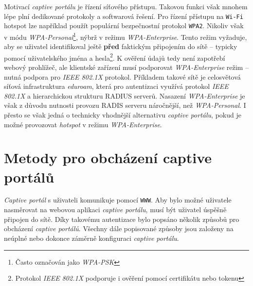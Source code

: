 \documentclass[thesis=M,czech]{FITthesis}[2012/10/20]
\begin{document}
Motivací \textit{captive portálu} je řízení síťového přístupu. Takovou funkci však mnohem lépe\cite{bakalarka-srovnani-captive-fwall-nac} plní dedikované protokoly a softwarová řešení. Pro řízení přístupu na \texttt{Wi-Fi} hotspot lze například použít populární bezpečnostní protokol \texttt{WPA2}. Nikoliv však v módu \textit{WPA-Personal}\footnote{Často označován jako \textit{WPA-PSK}}, nýbrž v režimu \textit{WPA-Enterprise}. Tento režim vyžaduje, aby se uživatel identifikoval ještě \textbf{před} faktickým připojením do sítě -- typicky pomocí uživatelského jména a hesla\footnote{Protokol \textit{IEEE 802.1X} podporuje i ověření pomocí certifikátu nebo tokenu}. K ověření údajů tedy není zapotřebí webový prohlížeč, ale klientské zařízení musí podporovat \textit{WPA-Enterprise} režim -- nutná podpora pro \textit{IEEE 802.1X} protokol. Příkladem takové sítě je celosvětová síťová infrastruktura \textit{eduroam}, která pro autentizaci využívá protokol \textit{IEEE 802.1X} a hierarchickou strukturu RADIUS serverů. Nasazení \textit{WPA-Enterprise} je však z důvodu nutnosti provozu RADIS serveru náročnější, než \textit{WPA-Personal}. I přesto se však jedná o technicky vhodnější alternativu \textit{captive portálu}, pokud je možné provozovat \textit{hotspot} v režimu \textit{WPA-Enterprise}.




\section{Metody pro obcházení captive portálů}
\label{sec:metody-obchazeni-captive-portalu}

\textit{Captive portál} s uživateli komunikuje pomocí \texttt{WWW}. Aby bylo možné uživatele nasměrovat na webovou aplikaci \textit{captive portálu}, musí být uživatel úspěšně připojen do sítě. Díky takovému  autentizace bylo popsáno několik způsobů pro obcházení \textit{captive portálů}. Všechny dále popisované způsoby jsou založeny na neúplné nebo dokonce záměrně  konfiguraci \textit{captive portálu}.
\end{document}
